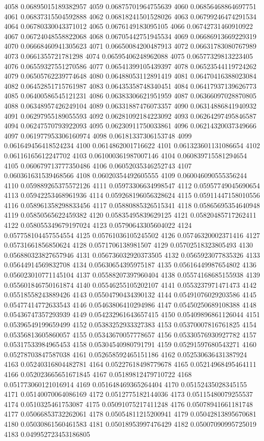 4058 0.06895015189382957
4059 0.06875701964755639
4060 0.06856468864697751
4061 0.06837315504592888
4062 0.06818241501528026
4063 0.06799246474291534
4064 0.06780330043371012
4065 0.0676149183095105
4066 0.06742731460910922
4067 0.06724048558822068
4068 0.06705442751945534
4069 0.06686913669229319
4070 0.06668460941305623
4071 0.06650084200487913
4072 0.06631783080767989
4073 0.0661355721781298
4074 0.06595406248962088
4075 0.06577329813223405
4076 0.06559327551270586
4077 0.06541399105439397
4078 0.06523544119724262
4079 0.06505762239774648
4080 0.06488053112891419
4081 0.06470416388023084
4082 0.06452851715761987
4083 0.06435358748340451
4084 0.06417937139626773
4085 0.06400586545121231
4086 0.06383306621951959
4087 0.06366097028870805
4088 0.06348957426249104
4089 0.06331887476073357
4090 0.06314886841940932
4091 0.06297955189055593
4092 0.06281092184223092
4093 0.06264297495846587
4094 0.06247570793922093
4095 0.06230911750033861
4096 0.06214320037349666
4097 0.061977953306160974
4098 0.06181337306153748
4099 0.061649456418524234
4100 0.0614862001716622
4101 0.061323601131086654
4102 0.06116165612247702
4103 0.061000361987007146
4104 0.060839715581294654
4105 0.060679713777350486
4106 0.06052035346252743
4107 0.060361631539468566
4108 0.06020354492605555
4109 0.060046090555356244
4110 0.059889265375572126
4111 0.05973306634998547
4112 0.05957749045690654
4113 0.05942253468961936
4114 0.059268196056328624
4115 0.05911447158010556
4116 0.058961358298833456
4117 0.05880885326515341
4118 0.05865695354640948
4119 0.05850565622459382
4120 0.05835495839629125
4121 0.05820485717262411
4122 0.058055349679197024
4123 0.05790643305604022
4124 0.057758104457554554
4125 0.05761036105245502
4126 0.05746320002371416
4127 0.05731661856850624
4128 0.0571706138981507
4129 0.05702518323805493
4130 0.056880323827657946
4131 0.056736032920373505
4132 0.0565923077835326
4133 0.05644914569832708
4134 0.05630654395975187
4135 0.05616449987654802
4136 0.056023010771145104
4137 0.05588207397960404
4138 0.05574168685155938
4139 0.055601846750161874
4140 0.05546255105202107
4141 0.0553237971471473
4142 0.05518558243889426
4143 0.05504790434390132
4144 0.05491076029203586
4145 0.05477414772633543
4146 0.05463806410294986
4147 0.05450250689108388
4148 0.05436747357293939
4149 0.054232961643657415
4150 0.05409896861126044
4151 0.05396549199659499
4152 0.05383252933327383
4153 0.05370007816761825
4154 0.05356813605860057
4155 0.05343670057778657
4156 0.05330576930927782
4157 0.05317533984965453
4158 0.05304540980791791
4159 0.05291597680543271
4160 0.05278703847587038
4161 0.052658592465151186
4162 0.052530636431387924
4163 0.05240316804482781
4164 0.05227618498779678
4165 0.05214968495464111
4166 0.052023665651671845
4167 0.05189812479710722
4168 0.051773060121016914
4169 0.051648469365264404
4170 0.05152435028345155
4171 0.05140070064086169
4172 0.0512775182144036
4173 0.05115480079255537
4174 0.0510325461753087
4175 0.05091075217411248
4176 0.05078941661181748
4177 0.05066853732262061
4178 0.05054811215200941
4179 0.05042813895670681
4180 0.05030861560461583
4181 0.05018953997476429
4182 0.05007090995725019
4183 0.049952723453186805

